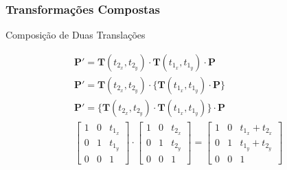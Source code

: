 \documentclass{beamer}
\begin{document}
\begin{frame}
\frametitle{Transformações Compostas}
	\begin{block}{Composição de Duas Translações}
		
			
		\begin{eqnarray*}
			\textbf{P}' = \textbf{T}(t_{2_x},t_{2_y}) \cdot \textbf{T}(t_{1_x},t_{1_y}) \cdot \textbf{P} \\
			\textbf{P}' = \textbf{T}(t_{2_x},t_{2_y}) \cdot \{\textbf{T}(t_{1_x},t_{1_y}) \cdot \textbf{P} \} \\
			\textbf{P}' = \{\textbf{T}(t_{2_x},t_{2_y}) \cdot \textbf{T}(t_{1_x},t_{1_y}) \} \cdot \textbf{P}  \\
			\begin{bmatrix}
					1	& 0 	& t_{1_x} \\
					0 	& 1	& t_{1_y} \\
					0	& 0	& 1
			\end{bmatrix}
			\cdot \begin{bmatrix}
					1	& 0 	& t_{2_x} \\
					0 	& 1	& t_{2_y} \\
					0	& 0	& 1
			\end{bmatrix}
			= \begin{bmatrix}
					1	& 0 	& t_{1_x} + t_{2_x} \\
					0 	& 1	& t_{1_y} + t_{2_y}\\
					0	& 0	& 1
			\end{bmatrix}
		\end{eqnarray*}
				

	\end{block}
\end{frame}
\end{document}
